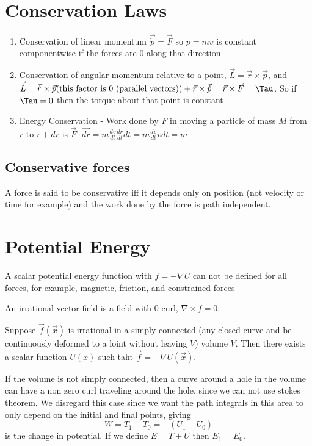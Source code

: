\documentclass{homework}
\begin{document}
\section{Conservation Laws}

\begin{enumerate}
    \item {Conservation of linear momentum $\vec{\dot{p}} = \vec{F}$ so $p = mv$ is constant componentwise if the forces are $0$ along that direction}
    \item {Conservation of angular momentum relative to a point, $\vec{L} = \vec{r} \times \vec{p}$, and $\vec{\dot{L}} = \vec{\dot {r}} \times \vec{p} \text{(this factor is $0$ (parallel vectors))} + \vec{r} \times \vec{\dot {p}} = \vec{r} \times \vec{F} = \Tau$. So if $\Tau = 0$ then the torque about that point is constant}
    \item {Energy Conservation - Work done by $F$ in moving a particle of mass $M$ from $r$ to $r + dr$ is $\vec{F} \cdot \vec{dr} = m\frac{dv}{dt}\frac{dr}{dt} dt = m\frac{dv}{dt}vdt = m$}
    
\end{enumerate}

\subsection{Conservative forces}
A force is said to be conservative iff it depends only on position (not velocity or time for example) and the work done by the force is path independent.

\section{Potential Energy}
A scalar potential energy function with $f = - \nabla U$ can not be defined for all forces, for example, magnetic, friction, and constrained forces

An irrational vector field is a field with $0$ curl, $\nabla \times f = 0$. 

Suppose $\vec{f}(\vec{x})$ is irrational in a simply connected (any closed curve and be continuously deformed to a loint without leaving $V$) volume $V$. Then there exists a scalar function $U(x)$ such taht $\vec{f} = - \nabla U(\vec{x})$.

If the volume is not simply connected, then a curve around a hole in the volume can have a non zero curl traveling around the hole, since we can not use stokes theorem. We disregard this case since we want the path integrals in this area to only depend on the initial and final points, giving 
\[W = T_1 - T_0 = -(U_1 - U_0)\]
is the change in potential. If we define $E = T + U$ then $E_1 = E_0$. 
\end{document}
